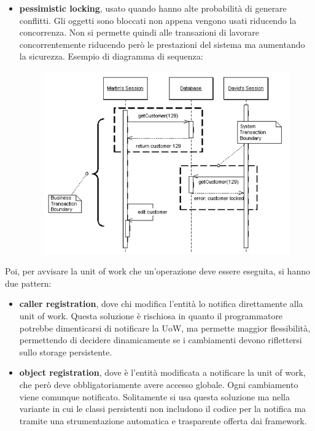 \begin{itemize}
\begin{figure}[H]
    \end{figure}
    \item \textbf{pessimistic locking}, usato quando hanno alte probabilità di generare conflitti. Gli oggetti sono bloccati non appena vengono usati riducendo la concorrenza. Non si permette quindi alle transazioni di lavorare concorrentemente riducendo però le prestazioni del sistema ma aumentando la sicurezza. Esempio di diagramma di sequenza:
    \begin{figure}[H]
        \centering
        \includegraphics[scale = 0.5]{Imm/PessimisticSketch.png}
    \end{figure}
\end{itemize}
Poi, per avvisare la unit of work che un'operazione  deve essere eseguita, si hanno due pattern:
\begin{itemize}
    \item \textbf{caller registration}, dove chi modifica l'entità lo notifica direttamente alla unit of work. Questa soluzione è rischiosa in quanto il programmatore potrebbe dimenticarsi di notificare la UoW, ma permette maggior flessibilità, permettendo di decidere dinamicamente se i cambiamenti devono riflettersi sullo storage persistente. 
    \item \textbf{object registration}, dove è l'entità modificata a notificare la unit of work, che però deve obbligatoriamente avere accesso globale. Ogni cambiamento viene comunque notificato. Solitamente si usa questa soluzione ma nella variante in cui le classi persistenti non includono il codice per la notifica ma tramite una strumentazione automatica e trasparente offerta dai framework.
\end{itemize}
